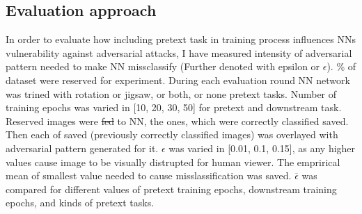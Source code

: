 \subsection{Evaluation approach}
In order to evaluate how including pretext task in training process influences NNs vulnerability against adversarial attacks, I have measured intensity of adversarial pattern needed to make NN missclassify
(Further denoted with epsilon or $\epsilon$).
\% of dataset were reserved for experiment.
During each evaluation round NN network was trined with rotation or jigsaw, or both, or none pretext tasks. Number of training epochs was varied in [10, 20, 30, 50] for pretext and downstream task.
Reserved images were \st{fed} to NN, the ones, which were correctly classified saved.
Then each of saved (previously correctly classified images) was overlayed with adversarial pattern generated for it. $\epsilon$ was varied in [0.01, 0.1, 0.15], as any higher values cause image to be visually distrupted for human viewer.
The emprirical mean of smallest value needed to cause misslassification was saved.
$\overline{\epsilon}$ was compared for different values of pretext training epochs, downstream training epochs, and kinds of pretext tasks.